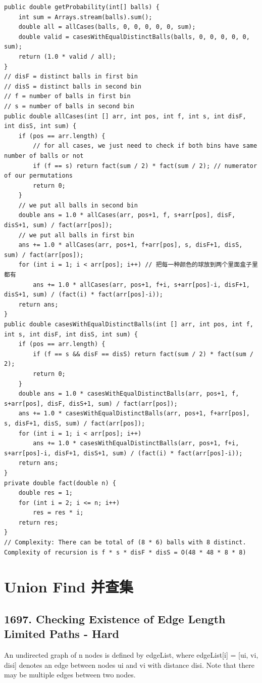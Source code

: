 \documentclass[9pt, b5paaper]{book}
\begin{document}
\begin{verbatim}
public double getProbability(int[] balls) {
    int sum = Arrays.stream(balls).sum();
    double all = allCases(balls, 0, 0, 0, 0, 0, sum);
    double valid = casesWithEqualDistinctBalls(balls, 0, 0, 0, 0, 0, sum);
    return (1.0 * valid / all);
}
// disF = distinct balls in first bin
// disS = distinct balls in second bin
// f = number of balls in first bin
// s = number of balls in second bin
public double allCases(int [] arr, int pos, int f, int s, int disF, int disS, int sum) {
    if (pos == arr.length) {
        // for all cases, we just need to check if both bins have same number of balls or not
        if (f == s) return fact(sum / 2) * fact(sum / 2); // numerator of our permutations
        return 0;
    }
    // we put all balls in second bin
    double ans = 1.0 * allCases(arr, pos+1, f, s+arr[pos], disF, disS+1, sum) / fact(arr[pos]);
    // we put all balls in first bin
    ans += 1.0 * allCases(arr, pos+1, f+arr[pos], s, disF+1, disS, sum) / fact(arr[pos]);
    for (int i = 1; i < arr[pos]; i++) // 把每一种颜色的球放到两个里面盒子里都有
        ans += 1.0 * allCases(arr, pos+1, f+i, s+arr[pos]-i, disF+1, disS+1, sum) / (fact(i) * fact(arr[pos]-i));
    return ans;
}
public double casesWithEqualDistinctBalls(int [] arr, int pos, int f, int s, int disF, int disS, int sum) {
    if (pos == arr.length) {
        if (f == s && disF == disS) return fact(sum / 2) * fact(sum / 2);
        return 0;
    }
    double ans = 1.0 * casesWithEqualDistinctBalls(arr, pos+1, f, s+arr[pos], disF, disS+1, sum) / fact(arr[pos]);
    ans += 1.0 * casesWithEqualDistinctBalls(arr, pos+1, f+arr[pos], s, disF+1, disS, sum) / fact(arr[pos]);
    for (int i = 1; i < arr[pos]; i++) 
        ans += 1.0 * casesWithEqualDistinctBalls(arr, pos+1, f+i, s+arr[pos]-i, disF+1, disS+1, sum) / (fact(i) * fact(arr[pos]-i));
    return ans;
}
private double fact(double n) {
    double res = 1;
    for (int i = 2; i <= n; i++) 
        res = res * i;
    return res;
}
// Complexity: There can be total of (8 * 6) balls with 8 distinct. Complexity of recursion is f * s * disF * disS = O(48 * 48 * 8 * 8)
\end{verbatim}


\chapter{Union Find 并查集}
\label{sec-6}
\section{1697. Checking Existence of Edge Length Limited Paths - Hard}
\label{sec-6-1}
An undirected graph of n nodes is defined by edgeList, where edgeList[i] = [ui, vi, disi] denotes an edge between nodes ui and vi with distance disi. Note that there may be multiple edges between two nodes.
\end{document}

